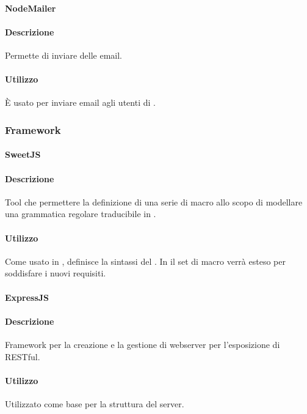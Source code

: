 \paragraph{NodeMailer}
\paragraph*{Descrizione}
Permette di inviare delle email.

\paragraph*{Utilizzo}
È usato per inviare email agli utenti di .

\subsubsection{Framework}
\paragraph{SweetJS}
\paragraph*{Descrizione}
Tool che permettere la definizione di una serie di macro allo scopo di modellare una grammatica regolare traducibile in  .

\paragraph*{Utilizzo}
Come usato in , definisce la sintassi del . In  il set di macro verrà esteso per soddisfare i nuovi requisiti.

\paragraph{ExpressJS}
\paragraph*{Descrizione}
Framework per la creazione e la gestione di webserver per l'esposizione di  RESTful.

\paragraph*{Utilizzo}
Utilizzato come base per la struttura del server.

